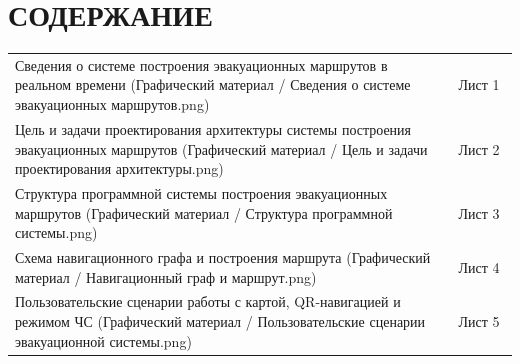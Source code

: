 \newpage
\section*{СОДЕРЖАНИЕ}
\tableofcontents
{\parindent0pt
\begin{tabular}{p{0.88\linewidth}p{0.18\linewidth}}
Сведения о системе построения эвакуационных маршрутов в реальном времени
(Графический материал / Сведения о системе эвакуационных маршрутов.png) & Лист 1\\
Цель и задачи проектирования архитектуры системы построения эвакуационных маршрутов
(Графический материал / Цель и задачи проектирования архитектуры.png) & Лист 2\\
Структура программной системы построения эвакуационных маршрутов
(Графический материал / Структура программной системы.png) & Лист 3\\
Схема навигационного графа и построения маршрута
(Графический материал / Навигационный граф и маршрут.png) & Лист 4\\
Пользовательские сценарии работы с картой, QR-навигацией и режимом ЧС
(Графический материал / Пользовательские сценарии эвакуационной системы.png) & Лист 5\\
\end{tabular}
}
